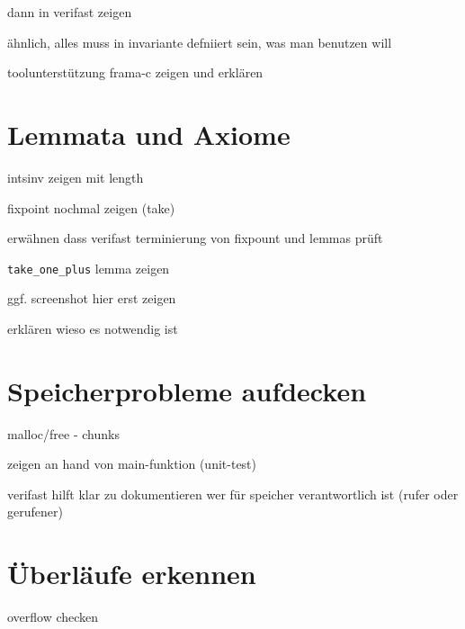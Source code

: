 dann in verifast zeigen

ähnlich, alles muss in invariante defniiert sein, was man benutzen will

toolunterstützung frama-c zeigen und erklären

\section{Lemmata und Axiome}
\label{verifizierung:lemma}

intsinv zeigen mit length

fixpoint nochmal zeigen (take)

erwähnen dass verifast terminierung von fixpount und lemmas prüft

\lstinline{take_one_plus} lemma zeigen

ggf. screenshot hier erst zeigen

erklären wieso es notwendig ist

\section{Speicherprobleme aufdecken}

malloc/free - chunks

zeigen an hand von main-funktion (unit-test)

verifast hilft klar zu dokumentieren wer für speicher verantwortlich ist (rufer oder gerufener)

\section{Überläufe erkennen}

overflow checken
